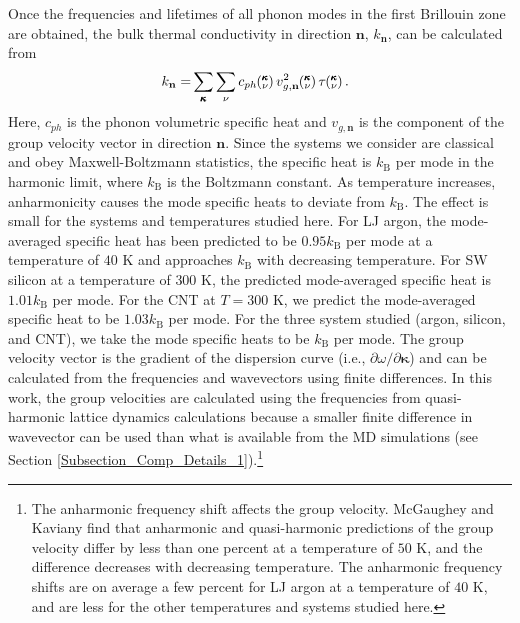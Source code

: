 \documentclass[12pt,twocolumn,iop]{/usr/share/texmf-texlive/tex/latex/iop/iopart}[/usr/share/texmf-texlive/tex/latex/iop/]
\newcommand{\kv}{\mspace{-4.0mu}\left(\mspace{-8.0mu}\begin{smallmatrix}&\pmb{\kappa} \\&\nu\end{smallmatrix}\mspace{-3.0mu}\right)}
\begin{document}
Once the frequencies and lifetimes of all phonon modes in the first
Brillouin zone are obtained, the bulk thermal conductivity in direction
$\mathbf{n}$, $k_{\mathbf{n}}$, can be calculated from \cite{ziman2001}
\begin{equation}\label{E-size:k_bulk}\
\begin{split}
k_{\mathbf{n}}=&\sum_{\pmb{\kappa}} \sum_\nu c_{ph} \kv v^{2}_{g,\mathbf{n}} \kv \tau \kv.
\end{split}
\end{equation}
Here, $c_{ph}$ is the phonon volumetric specific heat and ${v}_{g,\mathbf{n}}$ is
the component of the group velocity vector in direction $\mathbf{n}$. Since the systems we consider are classical and obey Maxwell-Boltzmann statistics,\cite{mcquarrie2000} the
specific heat is $k_{\mathrm{B}}$ per mode in the harmonic limit, where $k_{\mathrm{B}}$ is the Boltzmann constant. As temperature increases, anharmonicity causes the mode specific heats to deviate from $k_{\mathrm{B}}$.\cite{mcgaughey2004c} The effect is small for the systems and temperatures studied here. For LJ argon, the mode-averaged specific heat has been predicted to be $0.95k_{\mathrm{B}}$ per mode at a temperature of $40$ K and approaches $k_{\mathrm{B}}$ with decreasing temperature.\cite{mcgaughey2004c} For SW silicon at a temperature of $300$ K, the predicted mode-averaged specific heat is $1.01k_{\mathrm{B}}$ per mode.\cite{goicochea2010} For the CNT at $T=300$ K, we predict the mode-averaged specific heat to be $1.03k_{\mathrm{B}}$ per mode. For the three system studied (argon, silicon, and CNT), we take the mode specific heats to be $k_{\mathrm{B}}$ per mode.  The group
velocity vector is the gradient of the dispersion curve (i.e., $\partial \omega / \partial \pmb{\kappa}$) and can be calculated from the frequencies and wavevectors using finite differences. In this work, the group velocities are calculated using the frequencies from quasi-harmonic lattice dynamics calculations because a smaller finite difference in wavevector can be used than what is available from the MD simulations (see Section \ref{Subsection_Comp_Details_1}).\footnote[2]{The anharmonic frequency shift affects the group velocity. McGaughey and Kaviany find that anharmonic and quasi-harmonic predictions of the group velocity differ by less than one percent at a temperature of $50$ K, and the difference decreases with decreasing temperature.\cite{mcgaughey2004c} The anharmonic frequency shifts are on average a few percent for LJ argon at a temperature of $40$ K, and are less for the other temperatures and systems studied here.}
\end{document}

